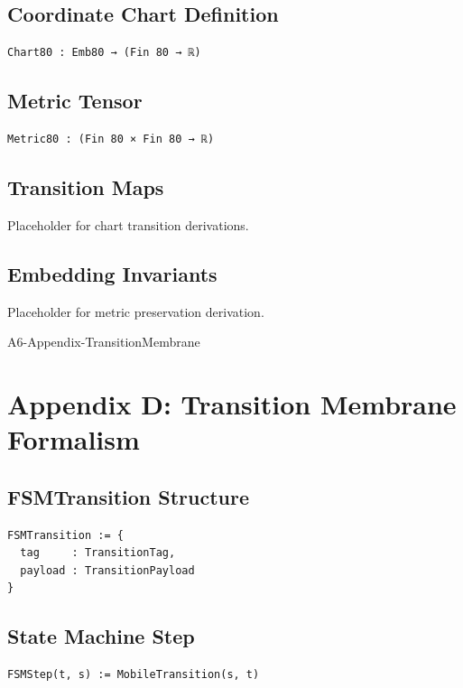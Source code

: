 \documentclass[11pt]{article}
\begin{document}
\subsection{Coordinate Chart Definition}
\begin{verbatim}
Chart80 : Emb80 → (Fin 80 → ℝ)
\end{verbatim}

\subsection{Metric Tensor}
\begin{verbatim}
Metric80 : (Fin 80 × Fin 80 → ℝ)
\end{verbatim}

\subsection{Transition Maps}
Placeholder for chart transition derivations.

\subsection{Embedding Invariants}
Placeholder for metric preservation derivation.

\newpage


\begin{citationmembrane}{A6-Appendix-TransitionMembrane}
\end{citationmembrane}

\section{Appendix D: Transition Membrane Formalism}

\subsection{FSMTransition Structure}
\begin{verbatim}
FSMTransition := {
  tag     : TransitionTag,
  payload : TransitionPayload
}
\end{verbatim}

\subsection{State Machine Step}
\begin{verbatim}
FSMStep(t, s) := MobileTransition(s, t)
\end{verbatim}
\end{document}
